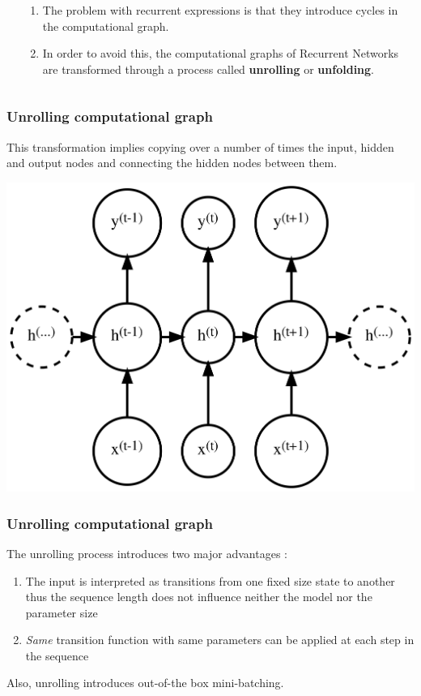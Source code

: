 \documentclass{beamer}
\begin{document}
\begin{frame}
\begin{columns}
\begin{column}{0.3\textwidth}
    \end{column}
    \begin{column}{0.7\textwidth}
      \begin{enumerate}
        \item The problem with recurrent expressions is that they introduce cycles in the computational graph.
        \item In order to avoid this, the computational graphs of Recurrent Networks are transformed through a process called \textbf{unrolling} or \textbf{unfolding}.
      \end{enumerate}
    \end{column}
  \end{columns}
\end{frame}
\begin{frame}
  \frametitle{Unrolling computational graph}
  This transformation implies copying over a number of times the input, hidden and output nodes and connecting the hidden nodes between them.
  \begin{center}
    \includegraphics[height=0.6\textheight]{../img/rnn-unrolled.png}
  \end{center}
\end{frame}
\begin{frame}
  \frametitle{Unrolling computational graph}
  The unrolling process introduces two major advantages \cite{goodfellow-et-al-2016}:
  \begin{enumerate}
    \item The input is interpreted as transitions from one fixed size state to another thus the sequence length does not influence neither the model nor the parameter size
    \item \textit{Same} transition function with same parameters can be applied at each step in the sequence
  \end{enumerate}
  Also, unrolling introduces out-of-the box mini-batching.
\end{frame}
\end{document}
